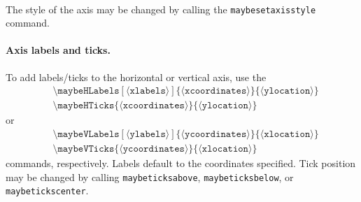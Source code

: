 \documentclass[11pt]{article}
\newcommand{\command}[1]{\text{\textbackslash}\texttt{#1}}
\newcommand{\param}[1]{\{\text{$\langle$}\texttt{#1}\text{$\rangle$}\}}
\newcommand{\optparam}[1]{[\text{$\langle$}\texttt{#1}\text{$\rangle$}]}
\begin{document}
\begin{center}
    \\
\end{center}

\begin{center}
    \hspace{2em}
\end{center}

The style of the axis may be changed by calling the \command{maybesetaxisstyle} command.
\begin{center}
\end{center}


\paragraph*{Axis labels and ticks.}
To add labels/ticks to the horizontal or vertical axis, use the
\begin{align*}
    &\command{maybeHLabels}\optparam{xlabels}\param{xcoordinates}\param{ylocation} \\
    &\command{maybeHTicks}\param{xcoordinates}\param{ylocation}
\end{align*}
or
\begin{align*}
    &\command{maybeVLabels}\optparam{ylabels}\param{ycoordinates}\param{xlocation} \\
    &\command{maybeVTicks}\param{ycoordinates}\param{xlocation}
\end{align*}
commands, respectively.
Labels default to the coordinates specified.
Tick position may be changed by calling \command{maybeticksabove}, \command{maybeticksbelow}, or \command{maybetickscenter}.
\end{document}
